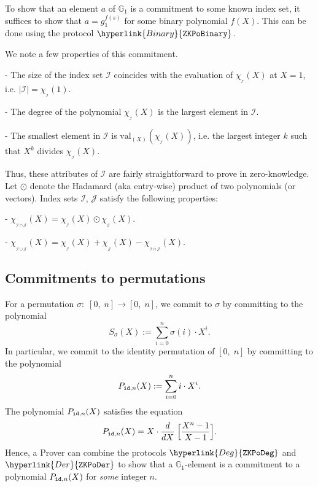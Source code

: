 \documentclass[11pt, lettersize, notitlepage, leqno, footskip=0.6cm]{article}
\newcommand{\lra}{\longrightarrow}
\newcommand{\mc}{\mathcal}
\newcommand{\mb}{\mathbb}
\newcommand{\mr}{\mathrm}
\newcommand{\vs}{\vspace{-0.15cm}}
\newcommand{\noin}{\noindent}
\numberwithin{equation}{section}
\begin{document}
To show that an element $a$ of $\mb{G}_1$ is a commitment to some known index set, it suffices to show that $a = g_1^{f(s)}$ for some binary polynomial $f(X)$. This can be done using the protocol $\hyperlink{Binary}{\tt{ZKPoBinary}}$.

We note a few properties of this commitment. \vspace{2mm}

\noin - The size of the index set $\mc{I}$ coincides with the evaluation of $\chi_{_\mc{I}}(X)$ at $X= 1$, i.e. $|\mc{I}| = \chi_{_\mc{I}}(1)$. \vspace{1mm}


\noin - The degree of the polynomial $\chi_{_\mc{I}}(X)$ is the largest element in $\mc{I}$. \vspace{1mm}

\noin - The smallest element in $\mc{I}$ is $\mr{val}_{(X)}(\chi_{_\mc{I}}(X))$, i.e. the largest integer $k$ such that $X^k$ divides $\chi_{_\mc{I}}(X)$. \vspace{2mm}

Thus, these attributes of $\mc{I}$ are fairly straightforward to prove in zero-knowledge. Let $\odot$ denote the Hadamard (aka entry-wise) product of two polynomials (or vectors). Index sets $\mc{I}$, $\mc{J}$ satisfy the following properties:\vspace{2mm}

\noin - $\chi_{_{\mc{I}\cap \mc{J}}}(X) = \chi_{_\mc{I}}(X)\odot \chi_{_\mc{J}}(X)$. \vspace{1mm}

\noin - $\chi_{_{\mc{I}\cup \mc{J}}}(X) = \chi_{_\mc{I}}(X)+ \chi_{_\mc{J}}(X) - \chi_{_{\mc{I}\cap \mc{J}}}(X)$. \vspace{1mm}

 


\subsection{\fontsize{11}{11}\selectfont Commitments to permutations}

For a permutation $\sigma:\;[0,\;n]\lra [0,\; n]$, we commit to $\sigma$ by committing to the polynomial \vs $$S_{\sigma}(X):= \sum_{i=0}^n \sigma(i)\cdot X^i .$$ In particular, we commit to the identity permutation of $[0,\;n]$ by committing to the polynomial \vspace{-2mm} $$ P_{{\tt{id}}, n}(X):=  \sum\limits_{i=0}^n i\cdot X^i.$$ The polynomial $P_{{\tt{id}}, n}(X)$ satisfies the equation \vs $$ P_{{\tt{id}}, n}(X) = X\cdot \frac{d}{dX}\;\Big[ \frac{X^{n}-1}{X-1} \Big].   $$ Hence, a Prover can combine the protocols $\hyperlink{Deg}{\tt{ZKPoDeg}}$ and $\hyperlink{Der}{\tt{ZKPoDer}}$ to show that a $\mb{G}_1$-element is a commitment to a polynomial $P_{{\tt{id}}, n}(X)$ for \textit{some} integer $n$.
\end{document}
